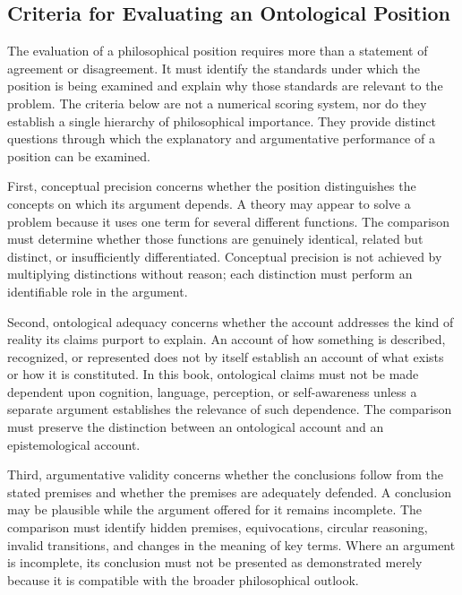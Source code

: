 \subsection{Criteria for Evaluating an Ontological Position}
\label{sec:ch08-s01-ss05}

\label{para:VS.B01.P01.C08.S01.SS05.P001}
The evaluation of a philosophical position requires more
than a statement of agreement or disagreement. It must
identify the standards under which the position is being
examined and explain why those standards are relevant to
the problem. The criteria below are not a numerical
scoring system, nor do they establish a single hierarchy
of philosophical importance. They provide distinct
questions through which the explanatory and argumentative
performance of a position can be examined.

\label{para:VS.B01.P01.C08.S01.SS05.P002}
First, conceptual precision concerns whether the position
distinguishes the concepts on which its argument depends.
A theory may appear to solve a problem because it uses one
term for several different functions. The comparison must
determine whether those functions are genuinely identical,
related but distinct, or insufficiently differentiated.
Conceptual precision is not achieved by multiplying
distinctions without reason; each distinction must perform
an identifiable role in the argument.

\label{para:VS.B01.P01.C08.S01.SS05.P003}
Second, ontological adequacy concerns whether the account
addresses the kind of reality its claims purport to explain.
An account of how something is described, recognized, or
represented does not by itself establish an account of
what exists or how it is constituted. In this book,
ontological claims must not be made dependent upon
cognition, language, perception, or self-awareness unless
a separate argument establishes the relevance of such
dependence. The comparison must preserve the distinction
between an ontological account and an epistemological
account.

\label{para:VS.B01.P01.C08.S01.SS05.P004}
Third, argumentative validity concerns whether the
conclusions follow from the stated premises and whether
the premises are adequately defended. A conclusion may
be plausible while the argument offered for it remains
incomplete. The comparison must identify hidden premises,
equivocations, circular reasoning, invalid transitions,
and changes in the meaning of key terms. Where an
argument is incomplete, its conclusion must not be
presented as demonstrated merely because it is compatible
with the broader philosophical outlook.

